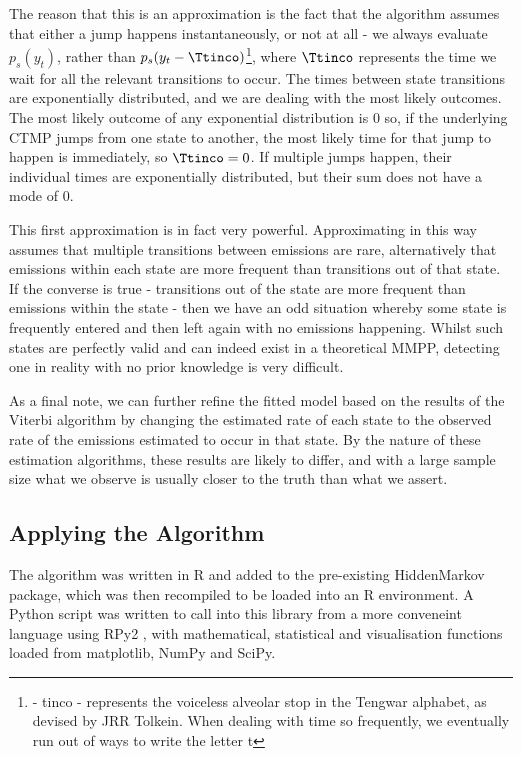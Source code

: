 The reason that this is an approximation is the fact that the algorithm assumes that either a jump happens instantaneously, or not at all - we always evaluate $p_s(y_t)$, rather than $p_s(y_t-\tengt)$\footnote{\tengt - tinco - represents the voiceless alveolar stop in the Tengwar alphabet, as devised by JRR Tolkein. When dealing with time so frequently, we eventually run out of ways to write the letter t}, where $\tengt$ represents the time we wait for all the relevant transitions to occur. The times between state transitions are exponentially distributed, and we are dealing with the most likely outcomes. The most likely outcome of any exponential distribution is $0$ so, if the underlying CTMP jumps from one state to another, the most likely time for that jump to happen is immediately, so $\tengt = 0$. If multiple jumps happen, their individual times are exponentially distributed, but their sum does not have a mode of 0.

This first approximation is in fact very powerful. Approximating in this way assumes that multiple transitions between emissions are rare, alternatively  that emissions within each state are more frequent than transitions out of that state. If the converse is true - transitions out of the state are more frequent than emissions within the state - then we have an odd situation whereby some state is frequently entered and then left again with no emissions happening. Whilst such states are perfectly valid and can indeed exist in a theoretical MMPP, detecting one in reality with no prior knowledge is very difficult.

As a final note, we can further refine the fitted model based on the results of the Viterbi algorithm by changing the estimated rate of each state to the observed rate of the emissions estimated to occur in that state. By the nature of these estimation algorithms, these results are likely to differ, and with a large sample size what we observe is usually closer to the truth than what we assert.

\subsection{Applying the Algorithm}


The algorithm was written in R and added to the pre-existing HiddenMarkov \cite{hiddenmarkov}
package, which was then recompiled to be loaded into an R environment. A Python script was written to call into this library from a more conveneint language using RPy2 %
, with mathematical, statistical and visualisation functions loaded from matplotlib\cite{matplotlib}, NumPy and SciPy.

